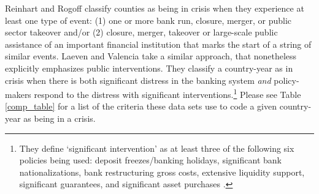 \documentclass[]{article}
\begin{document}
Reinhart and Rogoff \citeyearpar[10]{Reinhart2009,ReinhartRog2010} classify counties as being in crisis when they experience at least one type of event: (1) one or more bank run, closure, merger, or public sector takeover and/or (2) closure, merger, takeover or large-scale public assistance of an important financial institution that marks the start of a string of similar events. Laeven and Valencia \citeyearpar[228]{laeven2013} take a similar approach, that nonetheless explicitly emphasizes public interventions. They classify a country-year as in crisis when there is both significant distress in the banking system \emph{and} policy-makers respond to the distress with significant interventions.\footnote{They define `significant intervention' as at least three of the following six policies being used: deposit freezes/banking holidays, significant bank nationalizations, bank restructuring gross costs, extensive liquidity support, significant guarantees, and significant asset purchases \cite[][229]{laeven2013}.} Please see Table \ref{comp_table} for a list of the criteria these data sets use to code a given country-year as being in a crisis.
\end{document}
